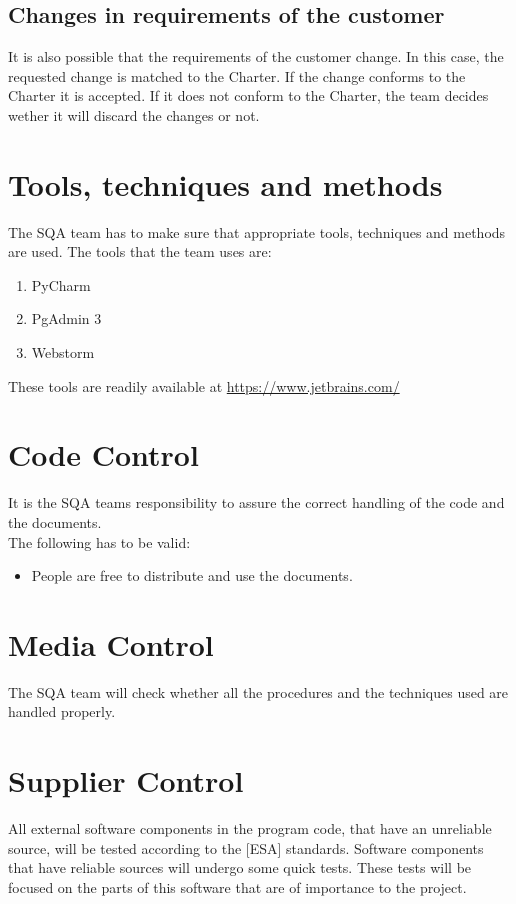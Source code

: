 \documentclass{report}
\begin{document}
\subsection{Changes in requirements of the customer}
It is also possible that the requirements of the customer change. In this case, the requested change is matched to the Charter. If the change conforms to the Charter it is accepted. If it does not conform to the Charter, the team decides wether it will discard the changes or not.

\section{Tools, techniques and methods}
The SQA team has to make sure that appropriate tools, techniques and methods are used. The tools that the team uses are:
\begin{enumerate}
\item PyCharm
\item PgAdmin 3
\item Webstorm
\end{enumerate}
These tools are readily available at \url {https://www.jetbrains.com/}

\section{Code Control}
It is the SQA teams responsibility to assure the correct handling of the code and the documents.\\
The following has to be valid:
\begin{itemize}
\item People are free to distribute and use the documents.

\end{itemize}

\section{Media Control}
The SQA team will check whether all the procedures and the techniques used are handled properly.

\section{Supplier Control}
All external software components in the program code, that have an unreliable source, will be tested according to the [ESA] standards. Software components that  have reliable sources will undergo some quick tests. These tests will be focused on the parts of this software that are of importance to the project.
\end{document}
